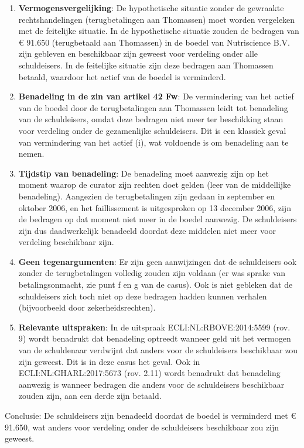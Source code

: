 \documentclass[
  dutch,
  a4paper,
]{article}
\begin{document}
\begin{enumerate}
\def\labelenumi{\arabic{enumi}.}
\item
  \textbf{Vermogensvergelijking}: De hypothetische situatie zonder de gewraakte rechtshandelingen (terugbetalingen aan Thomassen) moet worden vergeleken met de feitelijke situatie. In de hypothetische situatie zouden de bedragen van € 91.650 (terugbetaald aan Thomassen) in de boedel van Nutriscience B.V. zijn gebleven en beschikbaar zijn geweest voor verdeling onder alle schuldeisers. In de feitelijke situatie zijn deze bedragen aan Thomassen betaald, waardoor het actief van de boedel is verminderd.
\item
  \textbf{Benadeling in de zin van artikel 42 Fw}: De vermindering van het actief van de boedel door de terugbetalingen aan Thomassen leidt tot benadeling van de schuldeisers, omdat deze bedragen niet meer ter beschikking staan voor verdeling onder de gezamenlijke schuldeisers. Dit is een klassiek geval van vermindering van het actief (i), wat voldoende is om benadeling aan te nemen.
\item
  \textbf{Tijdstip van benadeling}: De benadeling moet aanwezig zijn op het moment waarop de curator zijn rechten doet gelden (leer van de middellijke benadeling). Aangezien de terugbetalingen zijn gedaan in september en oktober 2006, en het faillissement is uitgesproken op 13 december 2006, zijn de bedragen op dat moment niet meer in de boedel aanwezig. De schuldeisers zijn dus daadwerkelijk benadeeld doordat deze middelen niet meer voor verdeling beschikbaar zijn.
\item
  \textbf{Geen tegenargumenten}: Er zijn geen aanwijzingen dat de schuldeisers ook zonder de terugbetalingen volledig zouden zijn voldaan (er was sprake van betalingsonmacht, zie punt f en g van de casus). Ook is niet gebleken dat de schuldeisers zich toch niet op deze bedragen hadden kunnen verhalen (bijvoorbeeld door zekerheidsrechten).
\item
  \textbf{Relevante uitspraken}: In de uitspraak ECLI:NL:RBOVE:2014:5599 (rov. 9) wordt benadrukt dat benadeling optreedt wanneer geld uit het vermogen van de schuldenaar verdwijnt dat anders voor de schuldeisers beschikbaar zou zijn geweest. Dit is in deze casus het geval. Ook in ECLI:NL:GHARL:2017:5673 (rov. 2.11) wordt benadrukt dat benadeling aanwezig is wanneer bedragen die anders voor de schuldeisers beschikbaar zouden zijn, aan een derde zijn betaald.
\end{enumerate}

Conclusie: De schuldeisers zijn benadeeld doordat de boedel is verminderd met € 91.650, wat anders voor verdeling onder de schuldeisers beschikbaar zou zijn geweest.
\end{document}
